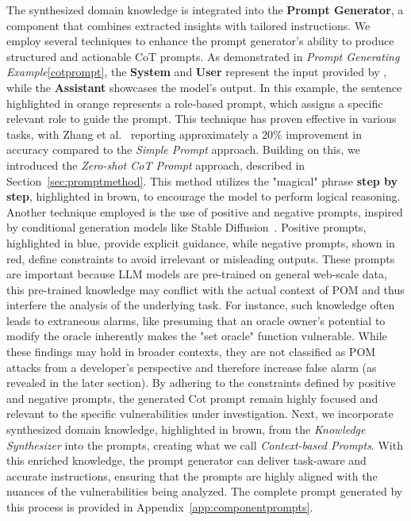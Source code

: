 The synthesized domain knowledge is integrated into the \textbf{Prompt Generator}, a component that combines extracted insights with tailored instructions.
We employ several techniques to enhance the prompt generator's ability to produce structured and actionable CoT prompts.
As demonstrated in \textit{Prompt Generating Example}\ref{cotprompt}, the \textbf{System} and \textbf{User} represent the input provided by \tool, while the \textbf{Assistant} showcases the model’s output.
In this example, the sentence highlighted in orange represents a role-based prompt, which assigns a specific relevant role to guide the prompt. 
This technique has proven effective in various tasks, with Zhang et al.~\cite{zheng2023helpful} reporting approximately a 20\% improvement in accuracy compared to the \textit{Simple Prompt} approach.
Building on this, we introduced the \textit{Zero-shot CoT Prompt} approach, described in Section~\ref{sec:promptmethod}.
This method utilizes the "magical" phrase \textbf{step by step}, highlighted in brown, to encourage the model to perform logical reasoning.
Another technique employed is the use of positive and negative prompts, inspired by conditional generation models like Stable Diffusion~\cite{ban2025understanding}. 
Positive prompts, highlighted in blue, provide explicit guidance, while negative prompts, shown in red, define constraints to avoid irrelevant or misleading outputs.
These prompts are important because LLM models are pre-trained on general web-scale data, this pre-trained knowledge may conflict with the actual context of POM and thus interfere the analysis of the underlying task. For instance, such knowledge often leads to extraneous alarms, like presuming that an oracle owner’s potential to modify the oracle inherently makes the "set oracle" function vulnerable. 
While these findings may hold in broader contexts, they are not classified as POM attacks from a developer’s perspective and therefore increase false alarm (as revealed in the later section).
By adhering to the constraints defined by positive and negative prompts, the generated Cot prompt remain highly focused and relevant to the specific vulnerabilities under investigation.
Next, we incorporate synthesized domain knowledge, highlighted in brown, from the \textit{Knowledge Synthesizer} into the prompts, creating what we call \textit{Context-based Prompts}. 
With this enriched knowledge, the prompt generator can deliver task-aware and accurate instructions, ensuring that the prompts are highly aligned with the nuances of the vulnerabilities being analyzed. 
The complete prompt generated by this process is provided in Appendix~\ref{app:componentprompts}.

